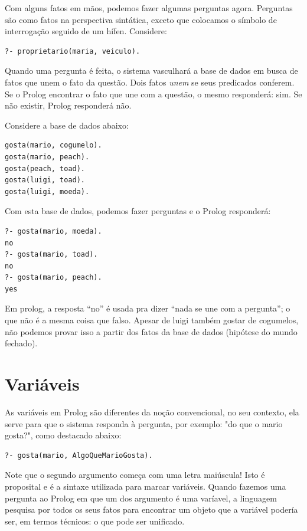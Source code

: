 Com alguns fatos em mãos, podemos fazer algumas perguntas agora. Perguntas são
como fatos na perspectiva sintática, exceto que colocamos o símbolo de
interrogação seguido de um hífen. Considere:

\begin{verbatim}
?- proprietario(maria, veiculo).
\end{verbatim}

Quando uma pergunta é feita, o sistema vasculhará a base de dados em busca de
fatos que unem o fato da questão. Dois fatos \emph{unem} se seus predicados
conferem. Se o Prolog encontrar o fato que une com a questão, o mesmo
responderá: sim. Se não existir, Prolog responderá não.

Considere a base de dados abaixo:

\begin{verbatim}
gosta(mario, cogumelo).
gosta(mario, peach).
gosta(peach, toad).
gosta(luigi, toad).
gosta(luigi, moeda).
\end{verbatim}

Com esta base de dados, podemos fazer perguntas e o Prolog responderá:

\begin{verbatim}
?- gosta(mario, moeda).
no
?- gosta(mario, toad).
no
?- gosta(mario, peach).
yes
\end{verbatim}

Em prolog, a resposta ``no'' é usada pra dizer ``nada se une com a pergunta''; o
que não é a mesma coisa que falso. Apesar de luigi também gostar de cogumelos,
não podemos provar isso a partir dos fatos da base de dados (hipótese do mundo
fechado).


\section{Variáveis}

As variáveis em Prolog são diferentes da noção convencional, no seu contexto,
ela serve para que o sistema responda à pergunta, por exemplo: "do que o mario
gosta?", como destacado abaixo:

\begin{verbatim}
?- gosta(mario, AlgoQueMarioGosta).
\end{verbatim}

Note que o segundo argumento começa com uma letra maiúscula! Isto é proposital e
é a sintaxe utilizada para marcar variáveis. Quando fazemos uma pergunta ao
Prolog em que um dos argumento é uma varíavel, a linguagem pesquisa por todos os
seus fatos para encontrar um objeto que a variável podería ser, em termos
técnicos: o que pode ser unificado. 

